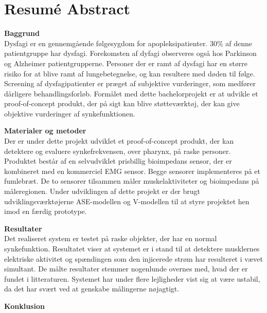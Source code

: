 \chapter{Resumé Abstract}

\textbf{Baggrund}\\
Dysfagi er en gennemgående følgesygdom for apopleksipatienter. 30\% af denne patientgruppe har dysfagi. Forekomsten af dyfagi observeres også hos Parkinson og Alzheimer patientgrupperne. Personer der er ramt af dysfagi har en større risiko for at blive ramt af lungebetegnelse, og kan resultere med døden til følge. Screening af dysfagipatienter er præget af subjektive vurderinger, som medfører dårligere behandlingsforløb. Formålet med dette bachelorprojekt er at udvikle et proof-of-concept produkt, der på sigt kan blive støtteværktøj, der kan give objektive vurderinger af synkefunktionen.

\textbf{Materialer og metoder}\\
Der er under dette projekt udviklet et proof-of-concept produkt, der kan detektere og evaluere synkefrekvensen, over pharynx, på raske personer. Produktet består af en selvudviklet prisbillig bioimpedans sensor, der er kombineret med en kommerciel EMG sensor. Begge sensorer implementeres på et fumlebræt. De to sensorer tilsammen måler  muskelaktiviteter og bioimpedans på måleregionen.   Under udviklingen af dette projekt er der brugt udviklingsværktøjerne ASE-modellen og V-modellen til at styre projektet hen imod en færdig prototype.  


\textbf{Resultater}\\
Det realiseret system er testet på raske objekter, der har en normal synkefunktion. Resultatet viser at systemet er i stand til at detektere musklernes elektriske aktivitet og spændingen som den injicerede strøm har resulteret i vævet simultant. De målte resultater stemmer nogenlunde overnes med, hvad der er fundet i litteraturen. Systemet har under flere lejligheder vist sig at være ustabil, da det har svært ved at genskabe målingerne nøjagtigt. 

\textbf{Konklusion}\\


